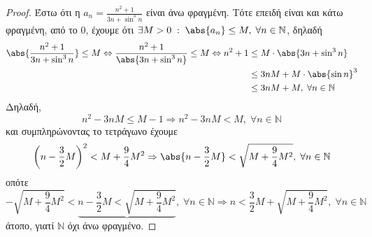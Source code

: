 \documentclass[main.tex]{subfiles}
\begin{document}
\begin{examples}
\begin{enumerate}[i)]
      \begin{proof}
      \item {}
        Έστω ότι η $ a_{n} = \frac{n^{2}+1}{3n+ \sin^{3}{n}} $ είναι άνω 
        φραγμένη. Τότε επειδή είναι και κάτω φραγμένη, από το 0, έχουμε ότι
        $ \exists M>0 \; : \; \abs{a_{n}} \leq M, \; \forall n \in 
        \mathbb{N} $, δηλαδή
        \begin{align*}
          \abs{\frac{n^{2}+1}{3n + \sin^{3}{n}}} \leq M \Leftrightarrow 
          \frac{n^{2}+1}{\abs{3n + \sin^{3}{n}}} \leq M \Leftrightarrow 
          n^{2}+1
               &\leq M \cdot \abs{3n + \sin^{3}{n}} \\ 
               &\leq 3nM + M \cdot \abs{\sin{n}} ^{3} \\
               &\leq 3n M +M, \; \forall n \in \mathbb{N}
        \end{align*} 
        Δηλαδή, 
        \[
          n^{2}-3nM \leq M-1 \Rightarrow n^{2}-3nM < M, \; \forall n \in 
          \mathbb{N}
        \] 
        και συμπληρώνοντας το τετράγωνο έχουμε
        \[
          \left(n - \frac{3}{2} M\right)^{2} < M + \frac{9}{4} M^{2}
          \Rightarrow \abs{n - \frac{3}{2} M} < 
          \sqrt{M + \frac{9}{4} M^{2}}, \; \forall n \in \mathbb{N}
        \]
        οπότε
        \[
          - \sqrt{M + \frac{9}{4} M^{2}}< \underbrace{n- \frac{3}{2} M 
          < \sqrt{M + \frac{9}{4} M^{2}}}, \; \forall n \in \mathbb{N} 
          \Rightarrow n < \frac{3}{2} M + \sqrt{M + \frac{9}{4} M^{2}}, 
          \; \forall n \in \mathbb{N} 
        \] 
        άτοπο, γιατί $ \mathbb{N} $ όχι άνω φραγμένο.
      \end{proof}
  \end{enumerate}
\end{examples}

\end{document}
